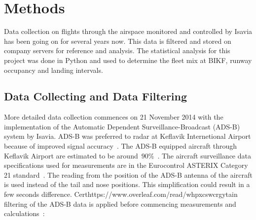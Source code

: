 

\chapter{Methods\label{cha:methods}}
Data collection on flights through the airspace monitored and controlled by Isavia has been going on for several years now. This data is filtered and stored on company servers for reference and analysis. The statistical analysis for this project was done in Python and used to determine the fleet mix at BIKF, runway occupancy and landing intervals.

\section{Data Collecting and Data Filtering}
More detailed data collection commences on 21 November 2014 with the implementation of the Automatic Dependent Surveillance-Broadcast (ADS-B) system by Isavia. ADS-B was preferred to radar at Keflavik Internetional Airport because of improved signal accuracy~\cite{isavia_wiki}. The ADS-B equipped aircraft through Keflavik Airport are estimated to be around~$90\%$~\cite{isavia-rounardeild_rannsoknir_2018}. The aircraft surveillance data specifications used for measurements are in the Eurocontrol ASTERIX Category 21 standard~\cite{ASTERIX_ADS-B_specs}.
The reading from the position of the ADS-B antenna of the aircraft is used instead of the tail and nose positions. This simplification could result in a few seconds difference. Certhttps://www.overleaf.com/read/whpxcswcrgytain filtering of the ADS-B data is applied before commencing measurements and calculations~\cite{isavia_wiki}: 
